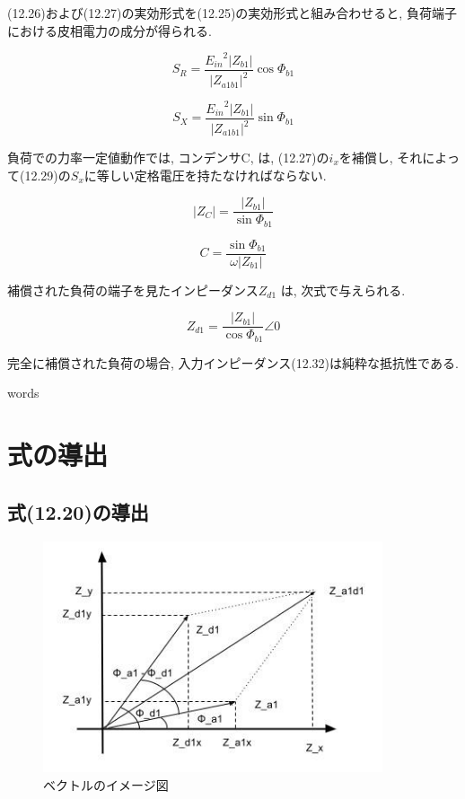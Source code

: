 \documentclass[fleqn,11pt,a4paper,dvipdfmx]{jsarticle}
\numberwithin{equation}{section}
\begin{document}
(12.26)および(12.27)の実効形式を(12.25)の実効形式と組み合わせると, 負荷端子における皮相電力の成分が得られる. 

\begin{equation}
  S_R = \frac{{E_{in}}^2 \left|Z_{b1}\right|}{{\left|Z_{a1b1}\right|}^2}\cos\Phi_{b1}
\end{equation}

\begin{equation}
  S_X = \frac{{E_{in}}^2 \left|Z_{b1}\right|}{{\left|Z_{a1b1}\right|}^2}\sin\Phi_{b1}
\end{equation}

負荷での力率一定値動作では, コンデンサC, 
は, (12.27)の$i_x$を補償し, それによって(12.29)の$S_x$に等しい定格電圧を持たなければならない. 

\begin{equation}
  \left|Z_C\right| = \frac{\left|Z_{b1}\right|}{\sin \Phi_{b1}}
\end{equation}

\begin{equation}
  C = \frac{\sin \Phi_{b1}}{\omega \left|Z_{b1}\right|}
\end{equation}

補償された負荷の端子を見たインピーダンス$Z_{d1}$ は, 次式で与えられる. 

\begin{equation}
  Z_{d1} = \frac{\left|Z_{b1}\right|}{\cos \Phi_{b1}} \angle 0
\end{equation}

完全に補償された負荷の場合, 入力インピーダンス(12.32)は純粋な抵抗性である. 


\newpage
words

\newpage
\setcounter{section}{1}
\setcounter{figure}{0}
\section*{式の導出}
\subsection*{式(12.20)の導出}
\begin{figure}[b]
  \begin{center}
    \includegraphics[width=100mm]{./img/vector_Z.jpg}
    \caption{ベクトルのイメージ図}
    \label{vector_Z}
  \end{center}
\end{figure}
\end{document}
